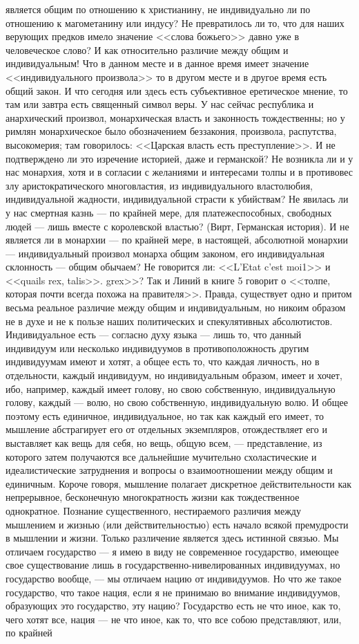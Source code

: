 \documentclass[12pt]{article}
\begin{document}
является общим по отношению к христианину, не индивидуально ли по отношению к магометанину или индусу? Не превратилось ли то, что для наших верующих предков имело значение <<слова божьего>>  давно уже в человеческое слово? И как относительно различие между общим и индивидуальным! Что в данном месте и в данное время имеет значение <<индивидуального произвола>>  то в другом месте и в другое время есть общий закон. И что сегодня или здесь есть субъективное еретическое мнение, то там или завтра есть священный символ веры. У нас сейчас республика и анархический произвол, монархическая власть и законность тождественны; но у римлян монархическое было обозначением беззакония, произвола, распутства, высокомерия; там говорилось: <<Царская власть есть преступление>>. И не подтверждено ли это изречение историей, даже и германской? Не возникла ли и у нас монархия, хотя и в согласии с желаниями и интересами толпы и в противовес злу аристократического многовластия, из индивидуального властолюбия, индивидуальной жадности, индивидуальной страсти к убийствам? Не явилась ли у нас смертная казнь --- по крайней мере, для платежеспособных, свободных людей --- лишь вместе с королевской властью? (Вирт, Германская история). И не является ли в монархии --- по крайней мере, в настоящей, абсолютной монархии --- индивидуальный произвол монарха общим законом, его индивидуальная склонность --- общим обычаем? Не говорится ли: <<L'Etat c'est moi1>> и <<quails rex, talis>>. grex>>? Так и Линий в книге 5 говорит о <<толпе, которая почти всегда похожа на правителя>>. Правда, существует одно и притом весьма реальное различие между общим и индивидуальным, но никоим образом не в духе и не к пользе наших политических и спекулятивных абсолютистов. Индивидуальное есть --- согласно духу языка --- лишь то, что данный индивидуум или несколько индивидуумов в противоположность другим индивидуумам имеют и хотят, а общее есть то, что каждая личность, но в отдельности, каждый индивидуум, но индивидуальным образом, имеет и хочет, ибо, например, каждый имеет голову, но свою собственную, индивидуальную голову, каждый --- волю, но свою собственную, индивидуальную волю. И общее поэтому есть единичное, индивидуальное, но так как каждый его имеет, то мышление абстрагирует его от отдельных экземпляров, отождествляет его и выставляет как вещь для себя, но вещь, общую всем, --- представление, из которого затем получаются все дальнейшие мучительно схоластические и идеалистические затруднения и вопросы о взаимоотношении между общим и единичным. Короче говоря, мышление полагает дискретное действительности как непрерывное, бесконечную многократность жизни как тождественное однократное. Познание существенного, нестираемого различия между мышлением и жизнью (или действительностью) есть начало всякой премудрости в мышлении и жизни. Только различение является здесь истинной связью. Мы отличаем государство --- я имею в виду не современное государство, имеющее свое существование лишь в государственно-нивелированных индивидуумах, но государство вообще, --- мы отличаем нацию от индивидуумов. Но что же такое государство, что такое нация, если я не принимаю во внимание индивидуумов, образующих это государство, эту нацию? Государство есть не что иное, как то, чего хотят все, нация --- не что иное, как то, что все собою представляют, или, по крайней 
\end{document}
